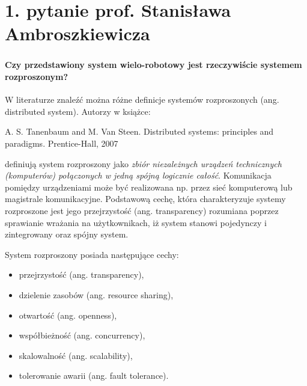 \section*{1. pytanie prof. Stanisława Ambroszkiewicza}
\begin{frame}
\frametitle{\secname}
\framesubtitle{Czy przedstawiony  system wielo-robotowy jest rzeczywiście systemem rozproszonym?}
\scriptsize

W literaturze znaleźć można różne definicje systemów rozproszonych (ang. distributed system). Autorzy w książce:
\newline

A. S. Tanenbaum and M. Van Steen. Distributed systems: principles and paradigms.
Prentice-Hall, 2007
\newline

definiują system rozproszony jako \textit{zbiór niezależnych urządzeń technicznych (komputerów) połączonych w jedną spójną logicznie całość}.  Komunikacja pomiędzy urządzeniami może być realizowana np. przez sieć komputerową lub magistrale komunikacyjne. Podstawową cechę, która charakteryzuje systemy rozproszone jest jego przejrzystość (ang. transparency) rozumiana poprzez sprawianie wrażania na użytkownikach, iż system stanowi pojedynczy i zintegrowany oraz spójny system.

System rozproszony posiada następujące cechy:
\begin{itemize}
	\item przejrzystość (ang. transparency),
	\item dzielenie zasobów (ang. resource sharing),
	\item otwartość (ang. openness),
	\item współbieżność (ang. concurrency),
	\item skalowalność (ang. scalability),
	\item tolerowanie awarii (ang. fault tolerance).	
\end{itemize}
\end{frame}



